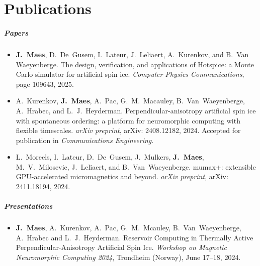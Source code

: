 \chapter{Publications}
\renewcommand{\bibitem}[1]{\item}

\paragraph*{Papers}
\begin{itemize}
    \bibitem{MAES-24}
    \textbf{J.~Maes}, D.~De~Gusem, I.~Lateur, J.~Leliaert, A.~Kurenkov, and B.~Van Waeyenberge.
    \newblock The design, verification, and applications of Hotspice: a Monte Carlo simulator for artificial spin ice.
    \newblock \emph{Computer Physics Communications}, page 109643, 2025.

    \bibitem{KUR-24}
    A.~Kurenkov, \textbf{J.~Maes}, A.~Pac, G.~M.~Macauley, B.~Van~Waeyenberge, A.~Hrabec, and L.~J.~Heyderman.
    \newblock Perpendicular-anisotropy artificial spin ice with spontaneous ordering: a platform for neuromorphic computing with flexible timescales.
    \newblock \emph{arXiv preprint}, arXiv: 2408.12182, 2024.
    \newblock Accepted for publication in \emph{Communications Engineering}.

    \bibitem{MOR-24}
    L.~Moreels, I.~Lateur, D.~De~Gusem, J.~Mulkers, \textbf{J.~Maes}, M.~V.~Milosevic, J.~Leliaert, and B.~Van~Waeyenberge.
    \newblock mumax+: extensible GPU-accelerated micromagnetics and beyond.
    \newblock \emph{arXiv preprint}, arXiv: 2411.18194, 2024.
\end{itemize}

\paragraph*{Presentations}
\begin{itemize}
    \bibitem{SPINENGINE-24}
    \textbf{J.~Maes}, A.~Kurenkov, A.~Pac, G.~M.~Mcauley, B.~Van~Waeyenberge, A.~Hrabec and L.~J.~Heyderman.
    \newblock Reservoir Computing in Thermally Active Perpendicular-Anisotropy Artificial Spin Ice.
    \newblock \emph{Workshop on Magnetic Neuromorphic Computing 2024}, Trondheim (Norway), June 17--18, 2024.
\end{itemize}

